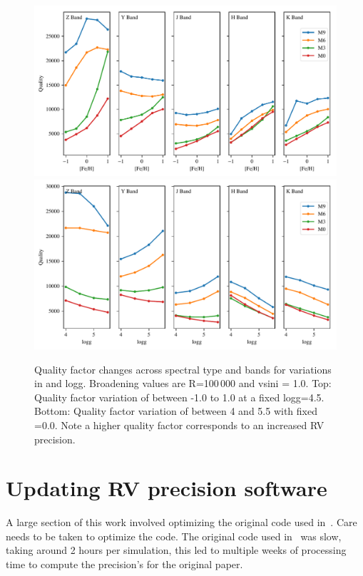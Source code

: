 \begin{figure}
\includegraphics[width=0.99\linewidth]{figures/information-content/metalicity_effect.pdf}\\
\includegraphics[width=0.99\linewidth]{figures/information-content/logg_effect.pdf}
\caption{Quality factor changes across spectral type and bands for variations in \feh{} and logg. Broadening values are R=100\,000 and vsini = 1.0\kmps{}. Top: Quality factor variation of \feh{} between -1.0 to 1.0 at a fixed logg=4.5. Bottom: Quality factor variation of \logg{} between 4 and 5.5 with fixed \feh{}=0.0. Note a higher quality factor corresponds to an increased {RV} precision.}
\label{fig:deviations}
\end{figure}


\clearpage

\section{Updating {RV} precision software}
A large section of this work involved optimizing the original code used in~\citet{figueira_radial_2016}.
Care needs to be taken to optimize the code. The original code used in~\citet{figueira_radial_2016} was slow, taking around 2 hours per simulation, this led to multiple weeks of processing time to compute the precision's for the original paper.

